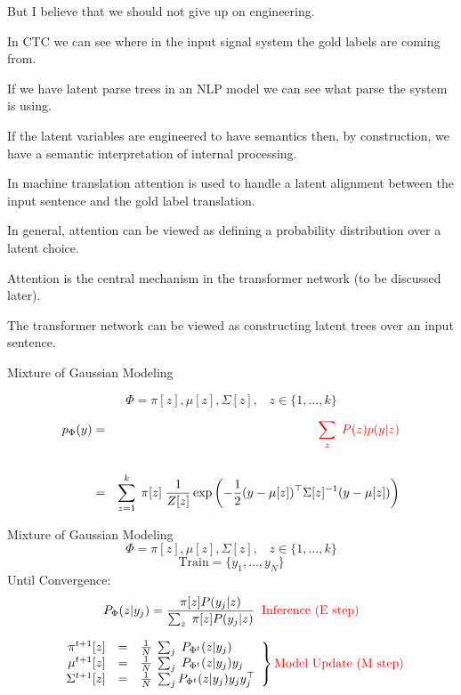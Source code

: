 {\vfill
But I believe that we should not give up on engineering.


In CTC we can see where in the input signal system the gold labels are coming from.

\vfill
If we have latent parse trees in an NLP model we can see what parse the system is using.

\vfill
If the latent variables are engineered to have semantics then, by construction, we have a semantic interpretation of internal processing.


In machine translation attention is used to handle a latent alignment between the input sentence and the gold label translation.

\vfill
In general, attention can be viewed as defining a probability distribution over a latent choice.

\vfill
Attention is the central mechanism in the transformer network (to be discussed later).

\vfill
The transformer network can be viewed as constructing latent trees over an input sentence.

{Mixture of Gaussian Modeling}

{\color{red} $$\Phi = \pi[z],\mu[z],\Sigma[z],\;\;\;z \in \{1,\ldots,k\}$$}

\begin{eqnarray*}
p_\Phi(y) & = & {\color{red} \sum_z\;P(z)p(y|z)} \\
\\
& = & \sum_{z=1}^k\;\pi[z]\;\frac{1}{Z[z]}\exp\left(-\frac{1}{2}(y-\mu[z])^\top \Sigma[z]^{-1}(y - \mu[z])\right)
\end{eqnarray*}

{Mixture of Gaussian Modeling}
\vspace{-4ex}
$$\Phi = \pi[z],\mu[z],\Sigma[z],\;\;\;z \in \{1,\ldots,k\}$$
$$\mbox{Train} = \{y_1,\ldots,y_N\}$$
Until Convergence:
$$P_\Phi(z|y_j) = \frac{\pi[z]P(y_j|z)}{\sum_z\;\pi[z]P(y_j|z)} \;\;\mbox{\color{red} Inference (E step)}$$

$$\left.
\begin{array}{rcl}
  \pi^{t+1}[z] & = & \frac{1}{N}\; \sum_j \;P_{\Phi^t}(z|y_j) \\
  \mu^{t+1}[z] & = & \frac{1}{N}\; \sum_j \;P_{\Phi^t}(z|y_j)y_j \\
  \Sigma^{t+1}[z] & = & \frac{1}{N}\; \sum_j P_{\Phi^t}(z|y_j)y_jy_j^\top
\end{array}
  \right\} \mbox{\color{red} Model Update (M step)}$$

}
